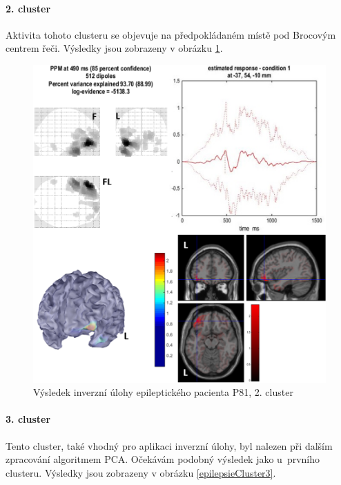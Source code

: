 \paragraph{2. cluster}
Aktivita tohoto clusteru se objevuje na předpokládaném místě pod Brocovým centrem řeči. Výsledky jsou zobrazeny v obrázku \ref{epilepsieCluster2}.

\begin{figure}[!h]
\includegraphics[width=1.0\textwidth]{casti/aplikace/epilepsie/2cl.png}
\caption{Výsledek inverzní úlohy epileptického pacienta P81, 2. cluster}
\label{epilepsieCluster2}
\end{figure}

\paragraph{3. cluster}
Tento cluster, také vhodný pro aplikaci inverzní úlohy, byl nalezen při dalším zpracování algoritmem PCA. Očekávám podobný výsledek jako u~prvního clusteru. Výsledky jsou zobrazeny v obrázku \ref{epilepsieCluster3}.

